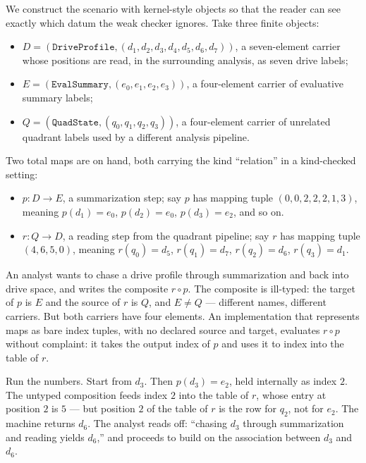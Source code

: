We construct the scenario with kernel-style objects so that the reader can
see exactly which datum the weak checker ignores. Take three finite objects:

\begin{itemize}
\item $D = (\texttt{DriveProfile}, (d_1, d_2, d_3, d_4, d_5, d_6, d_7))$, a
seven-element carrier whose positions are read, in the surrounding analysis,
as seven drive labels;
\item $E = (\texttt{EvalSummary}, (e_0, e_1, e_2, e_3))$, a four-element
carrier of evaluative summary labels;
\item $Q = (\texttt{QuadState}, (q_0, q_1, q_2, q_3))$, a four-element
carrier of unrelated quadrant labels used by a different analysis pipeline.
\end{itemize}

Two total maps are on hand, both carrying the kind ``relation'' in a
kind-checked setting:

\begin{itemize}
\item $p : D \to E$, a summarization step; say $p$ has mapping tuple
$(0, 0, 2, 2, 2, 1, 3)$, meaning $p(d_1) = e_0$, $p(d_2) = e_0$,
$p(d_3) = e_2$, and so on.
\item $r : Q \to D$, a reading step from the quadrant pipeline; say $r$ has
mapping tuple $(4, 6, 5, 0)$, meaning $r(q_0) = d_5$, $r(q_1) = d_7$,
$r(q_2) = d_6$, $r(q_3) = d_1$.
\end{itemize}

An analyst wants to chase a drive profile through summarization and back into
drive space, and writes the composite $r \circ p$. The composite is ill-typed:
the target of $p$ is $E$ and the source of $r$ is $Q$, and $E \neq Q$ ---
different names, different carriers. But both carriers have four elements. An
implementation that represents maps as bare index tuples, with no declared
source and target, evaluates $r \circ p$ without complaint: it takes the
output index of $p$ and uses it to index into the table of $r$.

Run the numbers. Start from $d_3$. Then $p(d_3) = e_2$, held internally as
index $2$. The untyped composition feeds index $2$ into the table of $r$,
whose entry at position $2$ is $5$ --- but position $2$ of the table of $r$ is
the row for $q_2$, not for $e_2$. The machine returns $d_6$. The analyst
reads off: ``chasing $d_3$ through summarization and reading yields $d_6$,''
and proceeds to build on the association between $d_3$ and $d_6$.

